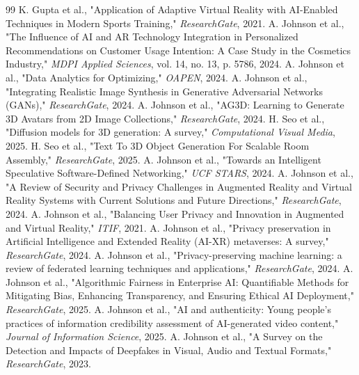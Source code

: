 \documentclass[conference]{IEEEtran}
\begin{document}
\begin{thebibliography}{99}
 K. Gupta et al., "Application of Adaptive Virtual Reality with AI-Enabled Techniques in Modern Sports Training," \textit{ResearchGate}, 2021.
 A. Johnson et al., "The Influence of AI and AR Technology Integration in Personalized Recommendations on Customer Usage Intention: A Case Study in the Cosmetics Industry," \textit{MDPI Applied Sciences}, vol. 14, no. 13, p. 5786, 2024.
 A. Johnson et al., "Data Analytics for Optimizing," \textit{OAPEN}, 2024.
 A. Johnson et al., "Integrating Realistic Image Synthesis in Generative Adversarial Networks (GANs)," \textit{ResearchGate}, 2024.
 A. Johnson et al., "AG3D: Learning to Generate 3D Avatars from 2D Image Collections," \textit{ResearchGate}, 2024.
 H. Seo et al., "Diffusion models for 3D generation: A survey," \textit{Computational Visual Media}, 2025.
 H. Seo et al., "Text To 3D Object Generation For Scalable Room Assembly," \textit{ResearchGate}, 2025.
 A. Johnson et al., "Towards an Intelligent Speculative Software-Defined Networking," \textit{UCF STARS}, 2024.
 A. Johnson et al., "A Review of Security and Privacy Challenges in Augmented Reality and Virtual Reality Systems with Current Solutions and Future Directions," \textit{ResearchGate}, 2024.
 A. Johnson et al., "Balancing User Privacy and Innovation in Augmented and Virtual Reality," \textit{ITIF}, 2021.
 A. Johnson et al., "Privacy preservation in Artificial Intelligence and Extended Reality (AI-XR) metaverses: A survey," \textit{ResearchGate}, 2024.
 A. Johnson et al., "Privacy-preserving machine learning: a review of federated learning techniques and applications," \textit{ResearchGate}, 2024.
 A. Johnson et al., "Algorithmic Fairness in Enterprise AI: Quantifiable Methods for Mitigating Bias, Enhancing Transparency, and Ensuring Ethical AI Deployment," \textit{ResearchGate}, 2025.
 A. Johnson et al., "AI and authenticity: Young people's practices of information credibility assessment of AI-generated video content," \textit{Journal of Information Science}, 2025.
 A. Johnson et al., "A Survey on the Detection and Impacts of Deepfakes in Visual, Audio and Textual Formats," \textit{ResearchGate}, 2023.

\end{thebibliography}
\end{document}
